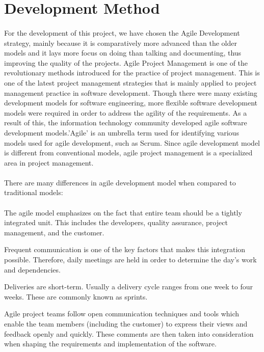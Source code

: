 \documentclass[a4paper]{report}
\begin{document}
\section{Development Method}
\paragraph{}
\large\textnormal{For the development of this project, we have chosen the Agile Development strategy, mainly because it is comparatively more advanced than the older models and it lays more focus on doing than talking and documenting, thus improving the quality of the projects. Agile Project Management is one of the revolutionary methods introduced for the practice of project management. This is one of the latest 
project management strategies that is mainly applied to project management practice in software development. Though there were many existing development models for software engineering, more flexible software development models were required in order to address the agility of the requirements. As a result of this, the information technology community developed agile software development models.'Agile' is an umbrella term used for identifying various models used for agile development, such as Scrum. Since agile development model is different from conventional models, agile project management is a specialized area in 
project management.}

\paragraph{}
\large\textnormal{There are many differences in agile development model when compared to traditional models:}

\begin{description}
	\paragraph{}
	\item[$\bullet$] The agile model emphasizes on the fact that entire team should be a tightly integrated unit. This includes the developers, quality assurance, project management, and the customer.
	\item[$\bullet$]Frequent communication is one of the key factors that makes this integration possible. Therefore, daily meetings are held in order to determine the day's work and dependencies.
	\item[$\bullet$]Deliveries are short-term. Usually a delivery cycle ranges from one week to four weeks. These are commonly known as sprints.
	\item[$\bullet$]Agile project teams follow open communication techniques and tools which enable the team members (including the customer) to express their views and feedback openly and quickly. These comments are then taken into consideration when shaping the requirements and implementation of the software.
\end{description}
\end{document}
